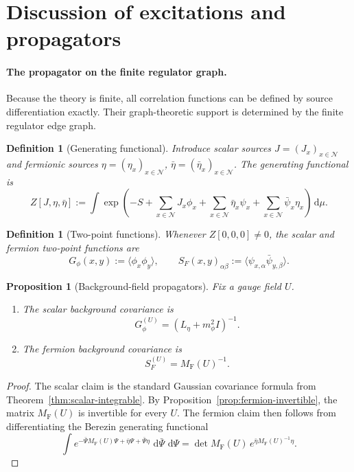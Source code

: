 \documentclass[11pt]{article}
\newtheorem{definition}[theorem]{Definition}
\newtheorem{proposition}[theorem]{Proposition}
\theoremstyle{remark}
\newcommand{\mcN}{\mathcal N}
\newcommand{\dd}{\,\mathrm d}
\begin{document}
\section{Discussion of excitations and propagators}
\label{sec:propagators}

\paragraph{The propagator on the finite regulator graph.}
Because the theory is finite, all correlation functions can be defined by
source differentiation exactly.  Their graph-theoretic support is determined by
the finite regulator edge graph.

\begin{definition}[Generating functional]
\label{def:generating}
Introduce scalar sources $J=(J_x)_{x\in\mcN}$ and fermionic sources
$\eta=(\eta_x)_{x\in\mcN}$, $\bar\eta=(\bar\eta_x)_{x\in\mcN}$.  The generating
functional is
\[
Z[J,\eta,\bar\eta]
:=
\int
\exp\!\left(
-S
+\sum_{x\in\mcN}J_x\phi_x
+\sum_{x\in\mcN}\bar\eta_x\psi_x
+\sum_{x\in\mcN}\bar\psi_x\eta_x
\right)\dd\mu.
\]
\end{definition}

\begin{definition}[Two-point functions]
\label{def:twopoint}
Whenever $Z[0,0,0]\neq 0$, the scalar and fermion two-point functions are
\[
G_\phi(x,y):=\langle \phi_x\phi_y\rangle,
\qquad
S_F(x,y)_{\alpha\beta}:=\langle \psi_{x,\alpha}\bar\psi_{y,\beta}\rangle.
\]
\end{definition}

\begin{proposition}[Background-field propagators]
\label{prop:background-prop}
Fix a gauge field $U$.
\begin{enumerate}[leftmargin=1.5em]
\item The scalar background covariance is
\[
G_\phi^{(U)}=(L_\eta+m_\phi^2 I)^{-1}.
\]
\item The fermion background
covariance is
\[
S_F^{(U)}=M_{\mathrm F}(U)^{-1}.
\]
\end{enumerate}
\end{proposition}
\begin{proof}
The scalar claim is the standard Gaussian covariance formula from
Theorem~\ref{thm:scalar-integrable}.  By
Proposition~\ref{prop:fermion-invertible}, the matrix $M_{\mathrm F}(U)$ is
invertible for every $U$.  The fermion claim then follows from differentiating
the Berezin generating functional
\[
\int e^{-\bar\Psi M_{\mathrm F}(U)\Psi+\bar\eta\Psi+\bar\Psi\eta}\,\dd\bar\Psi\,\dd\Psi
=
\det M_{\mathrm F}(U)\,
e^{\bar\eta M_{\mathrm F}(U)^{-1}\eta}.
\]
\end{proof}
\end{document}
